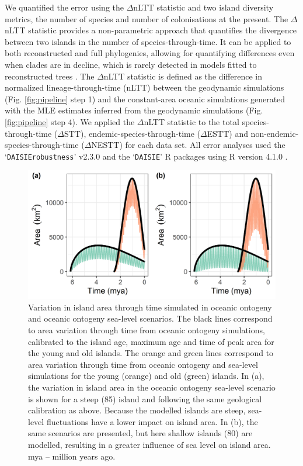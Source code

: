 \documentclass{article}
\begin{document}
We quantified the error using the $\Delta$nLTT statistic \citep{janzen_approximate_2015} and two island diversity metrics, the number of species and number of colonisations at the present. The $\Delta$nLTT statistic provides a non-parametric approach that quantifies the divergence between two islands in the number of species-through-time. It can be applied to both reconstructed and full phylogenies, allowing for quantifying differences even when clades are in decline, which is rarely detected in models fitted to reconstructed trees \citep{burin_how_2019}. The $\Delta$nLTT statistic is defined as the difference in normalized lineage-through-time (nLTT) between the geodynamic simulations (Fig. \ref{fig:pipeline} step 1) and the constant-area oceanic simulations generated with the MLE estimates inferred from the geodynamic simulations (Fig. \ref{fig:pipeline} step 4). We applied the $\Delta$nLTT statistic to the total species-through-time ($\Delta$STT), endemic-species-through-time ($\Delta$ESTT) and non-endemic-species-through-time ($\Delta$NESTT) for each data set. All error analyses used the `\texttt{DAISIErobustness}' v2.3.0 \citep{lambert_joshua_w_2021_5119973} and the `\texttt{DAISIE}' \citep{etienne_daisie_2021} R packages using R version 4.1.0 \citep{r_2021}.

\clearpage

\begin{figure}
    \centering
    \includegraphics[width=\textwidth]{area.png}
    \caption{Variation in island area through time simulated in oceanic ontogeny and oceanic ontogeny sea-level scenarios. The black lines correspond to area variation through time from oceanic ontogeny simulations, calibrated to the island age, maximum age and time of peak area for the young and old islands. The orange and green lines correspond to area variation through time from oceanic ontogeny and sea-level simulations for the young (orange) and old (green) islands. In (a), the variation in island area in the oceanic ontogeny sea-level scenario is shown for a steep (85\degree) island and following the same geological calibration as above. Because the modelled islands are steep, sea-level fluctuations have a lower impact on island area. In (b), the same scenarios are presented, but here shallow islands (80\degree) are modelled, resulting in a greater influence of sea level on island area. mya – million years ago.}
    \label{fig:area}
\end{figure}
\end{document}
